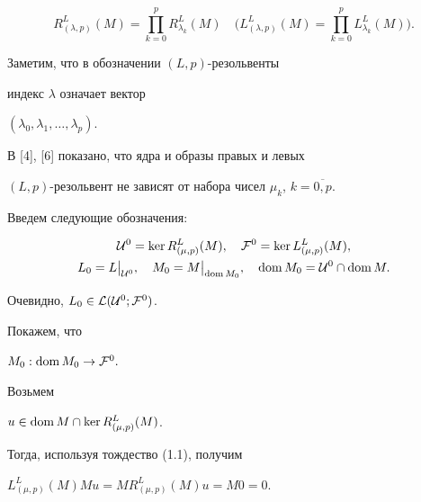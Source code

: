 $$


R_{(\lambda ,p)}^L(M)=\prod


\limits_{k=0}^pR_{\lambda _k}^L(M)\quad


\Big(L_{(\lambda ,p)}^L(M)=\prod\limits_{k=0}^pL_{\lambda _k}^L(M)\Big).


$$


Заметим, что в обозначении $(L,p)$-резольвенты


индекс $\lambda$ означает вектор


$(\lambda_0,\lambda_1,\dotsc,\lambda_{p})$.





В  [4], [6] показано, что ядра и образы правых и левых


$(L,p)$-резольвент не зависят от набора чисел $\mu_k$, $k=\overline{0,p}$.





Введем следующие обозначения:


\begin{gather*}


{\cal U}^0=\ker R^L_{(\mu ,p)}(M),\quad


{\cal F}^0=\ker L^L_{(\mu ,p)} (M),\\


L_0=L \big |_{{\cal U}^0},\quad


M_0=M\big |_{\dom M_{0}},\quad \dom M_0={\cal U}^0 \cap\dom M.


\end{gather*}


Очевидно, $L_0 \in {\cal L }({\cal U}^{0};{\cal F}^{0})$.


Покажем, что


$M_0:\operatorname{dom} M_0 \to {\cal F}^0.$


Возьмем


$u\in\operatorname{dom} M\cap\ker R_{(\mu,p)}^L(M)$.


Тогда, используя тождество (1.1), получим


$L_{(\mu,p)}^L(M)Mu=MR_{(\mu,p)}^L(M)u=M0=0$.








